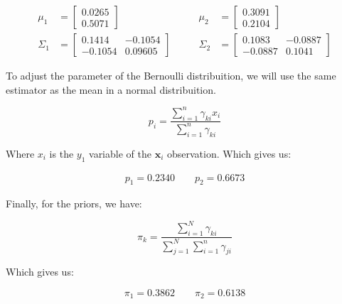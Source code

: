 \documentclass[12pt]{article}
\begin{document}
\begin{enumerate}[leftmargin=\labelsep]
    \begin{equation}
    \begin{aligned}
        \mu_1 &= \begin{bmatrix}
            0.0265 \\ 0.5071
        \end{bmatrix} &\qquad \mu_2&= \begin{bmatrix}
            0.3091 \\ 0.2104
        \end{bmatrix} \\
        \Sigma_1 &= \begin{bmatrix}
            0.1414  & -0.1054 \\
            -0.1054 & 0.09605 
        \end{bmatrix} &\qquad \Sigma_2 &= \begin{bmatrix}
            0.1083  & -0.0887 \\
            -0.0887 &  0.1041
        \end{bmatrix}
    \end{aligned}
    \end{equation}

    To adjust the parameter of the Bernoulli distribuition, we will use the same estimator as the mean in a normal distribuition.

    \begin{equation}
        p_i = \frac{\sum_{i=1}^{n}\gamma_{ki}x_i}{\sum_{i=1}^{n}\gamma_{ki}}
    \end{equation}

    Where $x_i$ is the $y_1$ variable of the $\mathbf{x}_i$ observation. Which gives us:

    \begin{equation}
    \begin{aligned}
        p_1 = 0.2340 \qquad p_2 = 0.6673
    \end{aligned}
    \end{equation}

    Finally, for the priors, we have:

    \begin{equation}
        \pi_k = \frac{\sum_{i=1}^{N}\gamma_{ki}}{\sum_{j=1}^{N}\sum_{i=1}^{n}\gamma_{ji}}
    \end{equation}

    Which gives us:

    \begin{equation}
        \pi_1 = 0.3862 \qquad \pi_2 = 0.6138
    \end{equation}


\end{enumerate}
\end{document}
